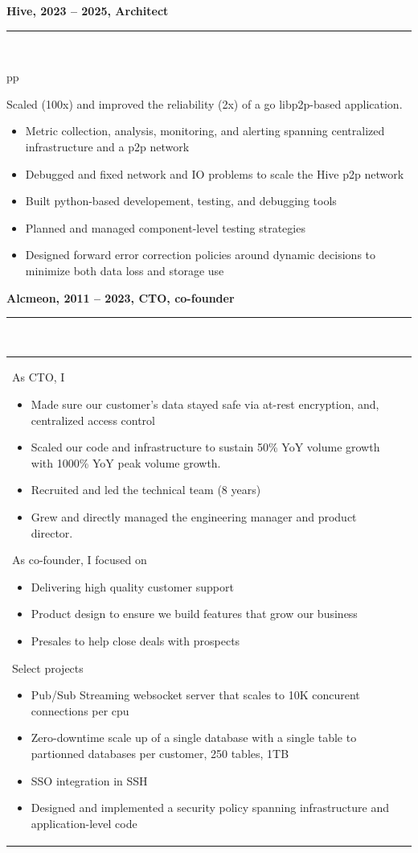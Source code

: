 \documentclass[a4paper,12pt]{article}
\newcommand{\ligne}[1]{\rule[0.5ex]{\textwidth}{#1}\\}
\newcommand{\styleRub}[1]{\textbf{\large #1}\par}
\newcommand{\indentStd}{\noindent\hspace*{10pt}}
\newenvironment{rubrique}[2][\linewidth]%
{\styleRub{#2}%
\ligne{0.5mm}
\setlength{\lenB}{#1}%
\setlength{\lenC}{\linewidth}%
\addtolength{\lenC}{-\lenA}%
\addtolength{\lenC}{-\lenB}%
\addtolength{\lenC}{-19pt}
\indentStd\begin{tabular}[t]{p{\lenB}p{\lenC}}}
{\end{tabular}}
\newlength{\lenA} %
\newlength{\lenB} %
\newlength{\lenC} %
\begin{document}
\vspace{0.5cm}
\begin{rubrique}{Hive, 2023 -- 2025, Architect}

Scaled (100x) and improved the reliability (2x) of a go libp2p-based application.

\begin{itemize}
\item Metric collection, analysis, monitoring, and alerting
        spanning centralized infrastructure and a p2p network
\item Debugged and fixed network and IO problems to scale the Hive p2p network
\item Built python-based developement, testing, and debugging tools
\item Planned and managed component-level testing strategies
\item Designed forward error correction policies around dynamic
        decisions to minimize both data loss and storage use
\end{itemize}

\end{rubrique}

\vspace{0.5cm}
\begin{rubrique}{Alcmeon, 2011 -- 2023, CTO, co-founder}

As CTO, I 
\begin{itemize}
\item Made sure our customer's data stayed safe via at-rest encryption,
        and, centralized access control
\item Scaled our code and infrastructure to sustain
        50\% YoY volume growth with 1000\% YoY peak volume growth.
\item Recruited and led the technical team (8 years)
\item Grew and directly managed the engineering manager and product
        director.
\end{itemize}


As co-founder, I focused on
\begin{itemize}
\item Delivering high quality customer support
\item Product design to ensure we build features that grow our business
\item Presales to help close deals with prospects
\end{itemize}

Select projects
\begin{itemize}
\item Pub/Sub Streaming websocket server that scales to 10K concurent connections per cpu
\item Zero-downtime scale up of a single database with a single table to partionned
 databases per customer, 250 tables, 1TB
\item SSO integration in SSH
\item Designed and implemented a security policy spanning 
infrastructure and application-level code
\end{itemize}

\end{rubrique}
\pagebreak
\end{document}
